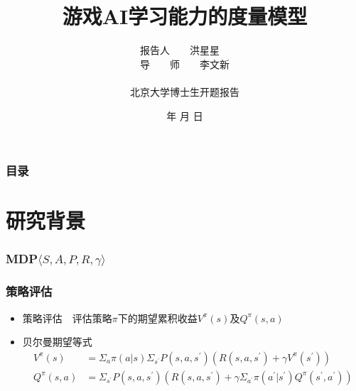 \documentclass{beamer}
\renewcommand{\today}{\number\year 年 \number\month 月 \number\day 日}
\begin{document}
\begin{CJK*}{GBK}{hei}
\title{游戏AI学习能力的度量模型}
\author{报告人~~~~洪星星~~\\ 导~~~~师~~~~李文新\\ ~~~~~~~~~~~~~~~~~~~~~~~\\ 北京大学博士生开题报告}
\date{\today}
\frame{\titlepage}

\begin{frame}
\frametitle{目录}
\tableofcontents
\end{frame}

\section{研究背景}
\begin{frame}\frametitle{MDP$\langle S, A, P, R, \gamma\rangle$}

\end{frame}

\begin{frame}\frametitle{策略评估}
\begin{itemize}
\item 策略评估~~评估策略$\pi$下的期望累积收益$V^{\pi}(s)$及$Q^{\pi}(s, a)$
\item 贝尔曼期望等式
    \begin{align*}
        V^{\pi}(s) &=\Sigma_{a} \pi(a | s) \Sigma_{s^{\prime}} P\left(s, a, s^{\prime}\right)\left(R\left(s, a, s^{\prime}\right)+\gamma V^{\pi}\left(s^{\prime}\right)\right) \\
        Q^{\pi}(s, a) &=\Sigma_{s^{\prime}} P\left(s, a, s^{\prime}\right)\left(R\left(s, a, s^{\prime}\right)+\gamma \Sigma_{a^{\prime}} \pi\left(a^{\prime} | s^{\prime}\right) Q^{\pi}\left(s^{\prime}, a^{\prime}\right)\right)
    \end{align*}
\end{itemize}
\end{frame}


\end{CJK*}
\end{document}
